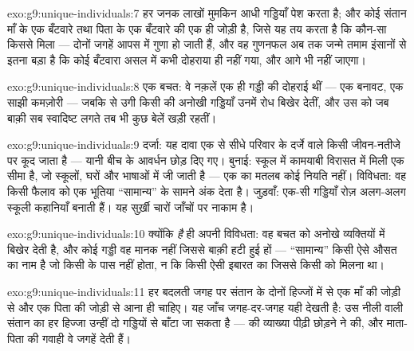 \begin{solution}{exo:g9:unique-individuals:7}
हर जनक लाखों मुमकिन आधी गड्डियाँ पेश करता है; और कोई संतान माँ के एक
बँटवारे तथा पिता के एक बँटवारे की एक ही जोड़ी है, जिसे यह तय करता है कि
कौन-सा  किससे मिला --- दोनों जगहें आपस में गुणा हो जाती हैं, और वह
गुणनफल अब तक जन्मे तमाम इंसानों से इतना बड़ा है कि कोई बँटवारा असल में
कभी दोहराया ही नहीं गया, और आगे भी नहीं जाएगा।
\end{solution}

\begin{solution}{exo:g9:unique-individuals:8}
एक बचत: वे नक़लें एक ही गड्डी की दोहराई थीं --- एक बनावट, एक साझी
कमज़ोरी --- जबकि  से उगी किसी  की अनोखी गड्डियाँ उनमें रोध बिखेर
देतीं, और उस  को जब बाक़ी सब स्वादिष्ट लगते तब भी कुछ बेलें खड़ी
रहतीं।
\end{solution}

\begin{solution}{exo:g9:unique-individuals:9}
दर्जा: यह दावा एक  से सीधे परिवार के दर्जे वाले किसी जीवन-नतीजे पर
कूद जाता है --- यानी बीच के आवर्धन छोड़ दिए गए। बुनाई: स्कूल में कामयाबी
विरासत में मिली एक सीमा है, जो स्कूलों, घरों और भाषाओं में जी जाती है ---
एक  का मतलब कोई नियति नहीं। विविधता: वह किसी फैलाव को एक भूतिया
``सामान्य'' के सामने अंक देता है। जुड़वाँ: एक-सी गड्डियाँ रोज़ अलग-अलग
स्कूली कहानियाँ बनाती हैं। यह सुर्ख़ी चारों जाँचों पर नाकाम है।
\end{solution}

\begin{solution}{exo:g9:unique-individuals:10}
क्योंकि  \emph{है} ही अपनी विविधता: वह बचत  को अनोखे
व्यक्तियों में बिखेर देती है, और कोई गड्डी वह मानक नहीं जिससे बाक़ी हटी
हुई हों --- ``सामान्य'' किसी ऐसे औसत का नाम है जो किसी के पास नहीं होता,
न कि किसी ऐसी इबारत का जिससे किसी को मिलना था।
\end{solution}

\begin{solution}{exo:g9:unique-individuals:11}
हर बदलती जगह पर संतान के दोनों हिज्जों में से एक माँ की जोड़ी से और एक
पिता की जोड़ी से आना ही चाहिए। यह जाँच जगह-दर-जगह यही देखती है: उस नीली
 वाली संतान का हर हिज्जा उन्हीं दो गड्डियों से बाँटा जा सकता है ---
 की व्याख्या पीढ़ी छोड़ने ने की, और माता-पिता की गवाही वे जगहें देती
हैं।
\end{solution}

